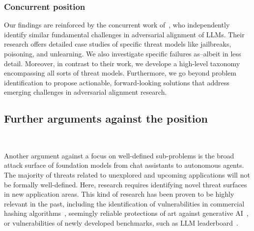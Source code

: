 \subsubsection{Concurrent position}

Our findings are reinforced by the concurrent work of~\citet{rando2025adversarial}, who independently identify similar fundamental challenges in adversarial alignment of LLMs. 
Their research offers detailed case studies of specific threat models like jailbreaks, poisoning, and unlearning. We also investigate specific failures as--albeit in less detail. Moreover, in contrast to their work, we develope a high-level taxonomy encompassing all sorts of threat models. Furthermore, we go beyond problem identification to propose actionable, forward-looking solutions that address emerging challenges in adversarial alignment research.




\subsection{Further arguments against the position}~\label{app:arguments_against}

Another argument against a focus on well-defined sub-problems is the broad attack surface of foundation models from chat assistants to autonomous agents. The majority of threats related to unexplored and upcoming applications will not be formally well-defined. Here, research requires identifying novel threat surfaces in new application areas. This kind of research has been proven to be highly relevant in the past, including the identification of vulnerabilities in commercial hashing algorithms~\cite{levenson2021apple}, seemingly reliable protections of art against generative AI~\cite{honig2024adversarial}, or vulnerabilities of newly developed benchmarks, such as LLM leaderboard~\cite{huang2025exploring}.

